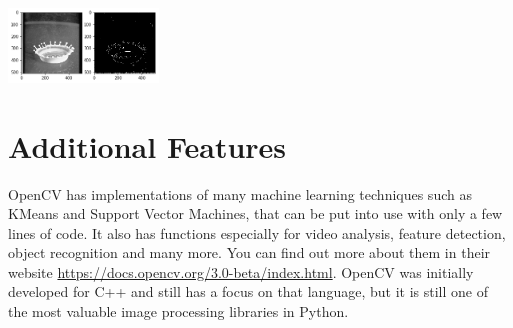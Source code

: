 \includegraphics[width=0.3\textwidth]{opencv_files/output_15_1.png}


\section{Additional Features}

OpenCV has implementations of many machine learning techniques such as
KMeans and Support Vector Machines, that can be put into use with only
a few lines of code. It also has functions especially for video
analysis, feature detection, object recognition and many more. You can
find out more about them in their website
\url{https://docs.opencv.org/3.0-beta/index.html}. OpenCV was
initially developed for C++ and still has a focus on that language,
but it is still one of the most valuable image processing libraries in
Python.
